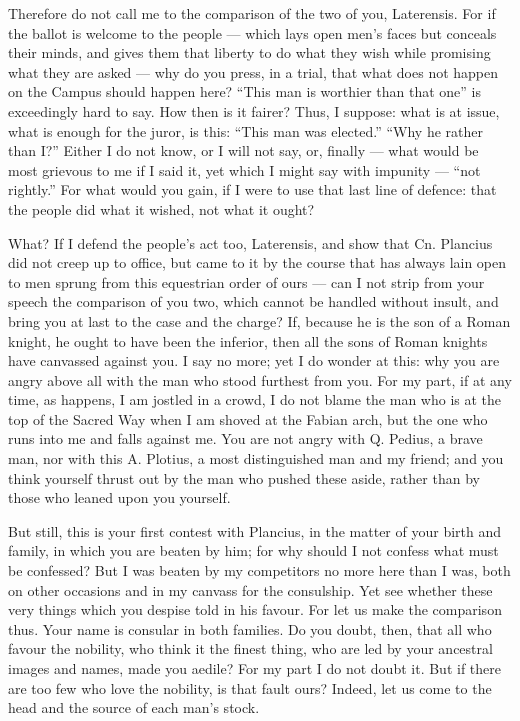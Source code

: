  Therefore do not call me to the comparison of the two of you, Laterensis. For if the ballot is welcome to the people --- which lays open men's faces but conceals their minds, and gives them that liberty to do what they wish while promising what they are asked --- why do you press, in a trial, that what does not happen on the Campus should happen here? ``This man is worthier than that one'' is exceedingly hard to say. How then is it fairer? Thus, I suppose: what is at issue, what is enough for the juror, is this: ``This man was elected.'' ``Why he rather than I?'' Either I do not know, or I will not say, or, finally --- what would be most grievous to me if I said it, yet which I might say with impunity --- ``not rightly.'' For what would you gain, if I were to use that last line of defence: that the people did what it wished, not what it ought?

 What? If I defend the people's act too, Laterensis, and show that Cn. Plancius did not creep up to office, but came to it by the course that has always lain open to men sprung from this equestrian order of ours --- can I not strip from your speech the comparison of you two, which cannot be handled without insult, and bring you at last to the case and the charge? If, because he is the son of a Roman knight, he ought to have been the inferior, then all the sons of Roman knights have canvassed against you. I say no more; yet I do wonder at this: why you are angry above all with the man who stood furthest from you. For my part, if at any time, as happens, I am jostled in a crowd, I do not blame the man who is at the top of the Sacred Way when I am shoved at the Fabian arch, but the one who runs into me and falls against me. You are not angry with Q. Pedius, a brave man, nor with this A. Plotius, a most distinguished man and my friend; and you think yourself thrust out by the man who pushed these aside, rather than by those who leaned upon you yourself.

 But still, this is your first contest with Plancius, in the matter of your birth and family, in which you are beaten by him; for why should I not confess what must be confessed? But I was beaten by my competitors no more here than I was, both on other occasions and in my canvass for the consulship. Yet see whether these very things which you despise told in his favour. For let us make the comparison thus. Your name is consular in both families. Do you doubt, then, that all who favour the nobility, who think it the finest thing, who are led by your ancestral images and names, made you aedile? For my part I do not doubt it. But if there are too few who love the nobility, is that fault ours? Indeed, let us come to the head and the source of each man's stock.

